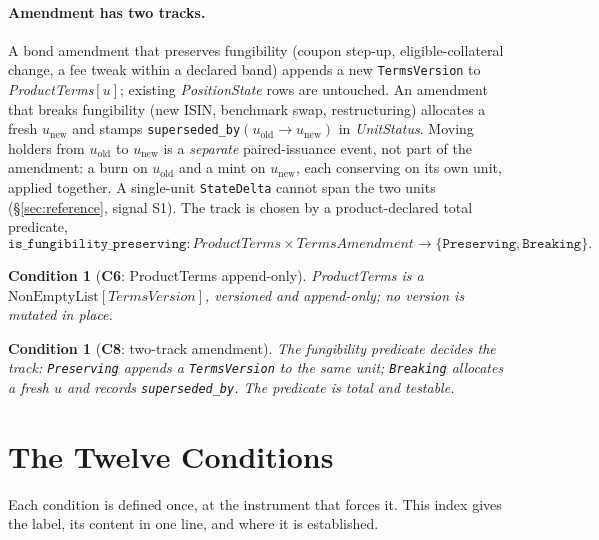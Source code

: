 \documentclass[11pt,a4paper]{article}
\newtheorem{condition}[definition]{Condition}
\begin{document}
\paragraph{Amendment has two tracks.}
A bond amendment that preserves fungibility (coupon step-up, eligible-collateral change, a
fee tweak within a declared band) appends a new \texttt{TermsVersion} to
\emph{ProductTerms}$[u]$; existing \emph{PositionState} rows are untouched. An amendment that
breaks fungibility (new ISIN, benchmark swap, restructuring) allocates a fresh
$u_{\mathrm{new}}$ and stamps \texttt{superseded\_by}$(u_{\mathrm{old}}\to u_{\mathrm{new}})$
in \emph{UnitStatus}. Moving holders from $u_{\mathrm{old}}$ to $u_{\mathrm{new}}$ is a
\emph{separate} paired-issuance event, not part of the amendment: a burn on $u_{\mathrm{old}}$
and a mint on $u_{\mathrm{new}}$, each conserving on its own unit, applied together. A
single-unit \texttt{StateDelta} cannot span the two units (\S\ref{sec:reference}, signal S1).
The track is chosen by a product-declared total predicate,
\[
\texttt{is\_fungibility\_preserving} : \mathit{ProductTerms}\times\mathit{TermsAmendment}
\to \{\texttt{Preserving},\texttt{Breaking}\}.
\]

\begin{condition}[\textbf{C6}: ProductTerms append-only]
\emph{ProductTerms} is a $\mathrm{NonEmptyList}[\mathit{TermsVersion}]$, versioned and
append-only; no version is mutated in place.
\end{condition}

\begin{condition}[\textbf{C8}: two-track amendment]
The fungibility predicate decides the track: \texttt{Preserving} appends a
\texttt{TermsVersion} to the same unit; \texttt{Breaking} allocates a fresh $u$ and records
\texttt{superseded\_by}. The predicate is total and testable.
\end{condition}

\section{The Twelve Conditions}
\label{sec:conditions}

Each condition is defined once, at the instrument that forces it. This index gives the
label, its content in one line, and where it is established.
\end{document}

